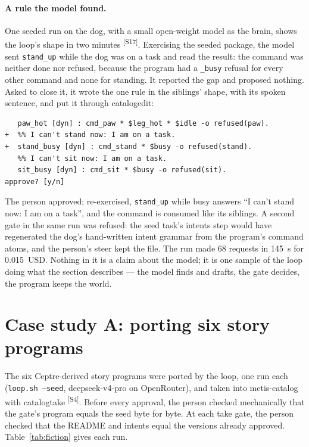 \documentclass[11pt]{article}
\newcommand{\tool}[1]{{\ttfamily\begingroup\def\_{\textunderscore\allowbreak}#1\endgroup}}
\newcommand{\src}[1]{\textsuperscript{[#1]}}
\begin{document}
\paragraph{A rule the model found.} One seeded run on the dog, with a
small open-weight model as the brain, shows the loop's shape in two
minutes \src{S17}. Exercising the seeded package, the model sent
\texttt{stand\_up} while the dog was on a task and read the result: the
command was neither done nor refused, because the program had a
\texttt{\_busy} refusal for every other command and none for standing.
It reported the gap and proposed nothing. Asked to close it, it wrote the
one rule in the siblings' shape, with its spoken sentence, and put it
through \tool{catalog\_edit}:

\begin{Verbatim}[fontsize=\small,frame=single]
   %% I can't lift my paw: my front leg is overheating.
   paw_hot [dyn] : cmd_paw * $leg_hot * $idle -o refused(paw).
+  %% I can't stand now: I am on a task.
+  stand_busy [dyn] : cmd_stand * $busy -o refused(stand).
   %% I can't sit now: I am on a task.
   sit_busy [dyn] : cmd_sit * $busy -o refused(sit).
approve? [y/n]
\end{Verbatim}

The person approved; re-exercised, \texttt{stand\_up} while busy answers
``I can't stand now: I am on a task'', and the command is consumed like
its siblings. A second gate in the same run was refused: the seed task's
intents step would have regenerated the dog's hand-written intent grammar
from the program's command atoms, and the person's steer kept the file.
The run made 68 requests in 145~s for 0.015~USD. Nothing in it is a
claim about the model; it is one sample of the loop doing what the
section describes --- the model finds and drafts, the gate decides, the
program keeps the world.

\section{Case study A: porting six story programs}\label{sec:fiction}

The six Ceptre-derived story programs were ported by the loop, one run
each (\texttt{loop.sh --seed}, deepseek-v4-pro on OpenRouter), and taken
into metis-catalog with \tool{catalog\_take} \src{S4}. Before every
approval, the person checked mechanically that the gate's program equals
the seed byte for byte. At each take gate, the person checked that the
README and intents equal the versions already approved. Table~\ref{tab:fiction}
gives each run.
\end{document}
